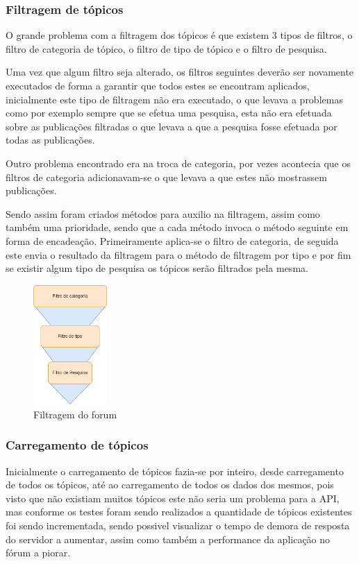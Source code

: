 \subsubsection{Filtragem de tópicos}
O grande problema com a filtragem dos tópicos é que existem 3 tipos de filtros, o filtro de categoria de tópico, o filtro de tipo de tópico e o filtro de pesquisa. 

Uma vez que algum filtro seja alterado, os filtros seguintes deverão ser novamente executados de forma a garantir que todos estes se encontram aplicados, inicialmente este tipo de filtragem não era executado, o que levava a problemas como por exemplo sempre que se efetua uma pesquisa, esta não era efetuada sobre as publicações filtradas o que levava a que a pesquisa fosse efetuada por todas as publicações.

Outro problema encontrado era na troca de categoria, por vezes acontecia que os filtros de categoria adicionavam-se o que levava a que estes não mostrassem publicações.

Sendo assim foram criados métodos para auxilio na filtragem, assim como também uma prioridade, sendo que a cada método invoca o método seguinte em forma de encadeação. Primeiramente aplica-se o filtro de categoria, de seguida este envia o resultado da filtragem para o método de filtragem por tipo e por fim se existir algum tipo de pesquisa os tópicos serão filtrados pela mesma.

\begin{figure}[htb]
  \centering
  \includegraphics[width=0.25\textwidth]{images/implementacao/frontend/forum/filtros/filtros.png}
  \caption{Filtragem do forum}
  \label{fig:72}
\end{figure}

\newpage

\subsubsection{Carregamento de tópicos}
Inicialmente o carregamento de tópicos fazia-se por inteiro, desde carregamento de todos os tópicos, até ao carregamento de todos os dados dos mesmos, pois visto que não existiam muitos tópicos este não seria um problema para a API, mas conforme os testes foram sendo realizados a quantidade de tópicos existentes foi sendo incrementada, sendo possivel visualizar o tempo de demora de resposta do servidor a aumentar, assim como também a performance da aplicação no fórum a piorar.

